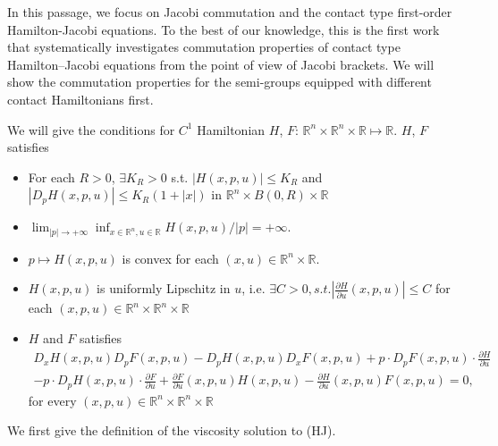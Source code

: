 \documentclass[preprint]{elsarticle}
\numberwithin{equation}{section}
\begin{document}
In this passage, we focus on Jacobi commutation and the contact type first-order Hamilton-Jacobi equations. To the best of our knowledge, this is the first work that systematically investigates commutation properties of contact type Hamilton–Jacobi equations from the point of view of Jacobi brackets. We will show the commutation properties for the semi-groups equipped with different contact Hamiltonians first. 

We will give the conditions for $C^1$ Hamiltonian $H$, $F$: $\mathbb R^n \times \mathbb R^n \times \mathbb R \mapsto \mathbb R$. $H$, $F$ satisfies 
\begin{itemize}
\item[(H1)] For each $R>0$, $\exists K_R >0$ s.t. $|H(x,p,u)| \leq K_R$ and $|D_pH(x,p,u) |\leq K_R(1+|x|)$ in $\mathbb R^n \times B(0,R) \times \mathbb R$ 
\item[(H2)] $\lim_{|p|\to+\infty}\inf_{x\in\mathbb R^n ,u \in \mathbb R}H(x,p,u)/|p|=+\infty$.
\item[(H3)] $p\mapsto H(x,p,u)$ is convex for each $(x,u)\in \mathbb R^n\times \mathbb R$.
\item[(H4)] $H(x,p,u)$ is uniformly Lipschitz in $u$, i.e. $ \exists C >0, s.t.|\frac{\partial H}{\partial u}(x,p,u)| \leq C$ for each $(x,p,u) \in \mathbb R^n\times \mathbb R^n\times \mathbb R$
\item[(H5)] $H$ and $F$ satisfies 
     \begin{align*}
          D_x H(x,p,u) D_pF(x,p,u)- D_p H(x,p,u) D_xF(x,p,u) + p \cdot D_pF(x,p,u) \cdot \frac{\partial H}{\partial u} 
          \\ - p \cdot D_pH(x,p,u) \cdot \frac{\partial F}{\partial u} + \frac{\partial F}{\partial u}(x,p,u) H(x,p,u)-\frac{\partial H}{\partial u}(x,p,u) F(x,p,u)=0,
     \end{align*}
     for every $(x,p,u) \in \mathbb R^n \times \mathbb R^n \times \mathbb R$
\end{itemize}

We first give the definition of the viscosity solution to (HJ).
\end{document}
